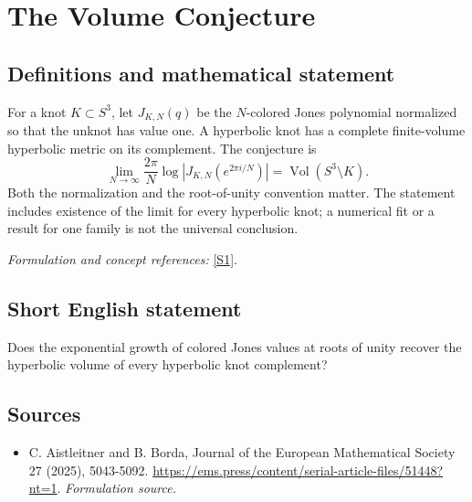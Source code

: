 \documentclass[11pt]{article}
\begin{document}
\section*{\texorpdfstring{The Volume Conjecture}{The Volume Conjecture}}\label{34}
\subsection{Definitions and mathematical statement}
For a knot $K\subset S^3$, let $J_{K,N}(q)$ be the $N$-colored Jones polynomial normalized so that the unknot has value one. A hyperbolic knot has a complete finite-volume hyperbolic metric on its complement. The conjecture is
\[
 \lim_{N\to\infty}\frac{2\pi}{N}\log\left|J_{K,N}(e^{2\pi i/N})\right|
 =\operatorname{Vol}(S^3\setminus K).
\]
Both the normalization and the root-of-unity convention matter. The statement includes existence of the limit for every hyperbolic knot; a numerical fit or a result for one family is not the universal conclusion.
\par\smallskip\textit{Formulation and concept references:} \href{https://ems.press/content/serial-article-files/51448?nt=1}{[S1]}.

\subsection{Short English statement}
Does the exponential growth of colored Jones values at roots of unity recover the hyperbolic volume of every hyperbolic knot complement?
\subsection{Sources}
\begin{itemize}
\item[S1]C. Aistleitner and B. Borda, Journal of the European Mathematical Society 27 (2025), 5043-5092.
\url{https://ems.press/content/serial-article-files/51448?nt=1}.
\textit{Formulation source.}
\end{itemize}
\end{document}
